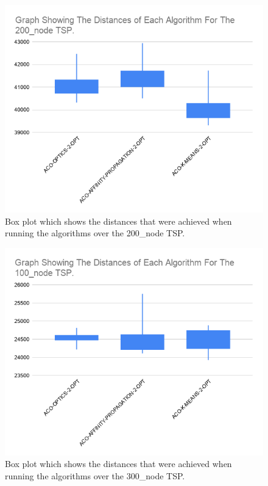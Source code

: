 \begin{figure}
    \centering
    \includegraphics[width=\textwidth]{figures/tsp_distance_200_node_graph.png}
    \caption{Box plot which shows the distances that were achieved when running the algorithms over the 200\_node TSP.}
    \label{fig:tsp_distance_200_node_graph}
\end{figure}

\begin{figure}
    \centering
    \includegraphics[width=\textwidth]{figures/tsp_distance_100_node_graph.png}
    \caption{Box plot which shows the distances that were achieved when running the algorithms over the 300\_node TSP.}
    \label{fig:tsp_distance_300_node_graph}
\end{figure}

